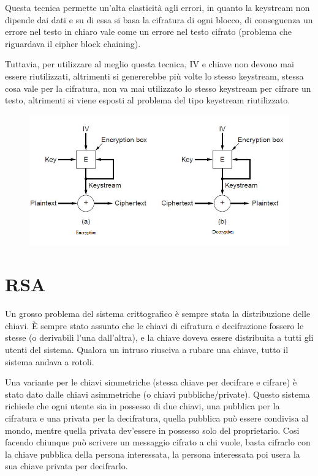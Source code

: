 Questa tecnica permette un’alta elasticità agli errori, in quanto la keystream non dipende dai dati e su di essa si basa la cifratura di ogni blocco, di conseguenza un errore nel testo in chiaro vale come un errore nel testo cifrato (problema che riguardava il cipher block chaining).

Tuttavia, per utilizzare al meglio questa tecnica, IV e chiave non devono mai essere riutilizzati, altrimenti si genererebbe più volte lo stesso keystream, stessa cosa vale per la cifratura, non va mai utilizzato lo stesso keystream per cifrare un testo, altrimenti si viene esposti al problema del tipo keystream riutilizzato.

\begin{figure}[H]
\centering
\includegraphics[scale=0.6]{res/img/56_StreamCipher.png}
\end{figure} 
 
\section{RSA}

Un grosso problema del sistema crittografico è sempre stata la distribuzione delle chiavi. 
È sempre stato assunto che le chiavi di cifratura e decifrazione fossero le stesse (o derivabili l’una dall’altra), e la chiave doveva essere distribuita a tutti gli utenti del sistema. Qualora un intruso riusciva a rubare una chiave, tutto il sistema andava a rotoli.

Una variante per le chiavi simmetriche (stessa chiave per decifrare e cifrare) è stato dato dalle chiavi asimmetriche (o chiavi pubbliche/private).
Questo sistema richiede che ogni utente sia in possesso di due chiavi, una pubblica per la cifratura e una privata per la decifratura, quella pubblica può essere condivisa al mondo, mentre quella privata dev’essere in possesso solo del proprietario.
Cosi facendo chiunque può scrivere un messaggio cifrato a chi vuole, basta cifrarlo con la chiave pubblica della persona interessata, la persona interessata poi usera la sua chiave privata per decifrarlo.

